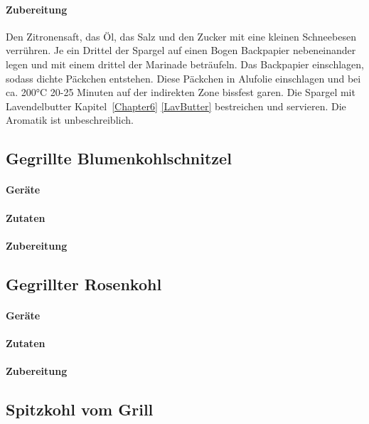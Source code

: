 \paragraph{Zubereitung}
Den Zitronensaft, das Öl, das Salz und den Zucker mit eine kleinen Schneebesen 
verrühren. Je ein Drittel der Spargel auf einen Bogen Backpapier nebeneinander 
legen und mit einem drittel der Marinade beträufeln. Das Backpapier 
einschlagen, sodass dichte Päckchen entstehen. Diese Päckchen in Alufolie 
einschlagen und bei ca. 200°C 20-25 Minuten auf der indirekten Zone bissfest 
garen. Die Spargel mit Lavendelbutter Kapitel~\ref{Chapter6} \vref{LavButter} 
bestreichen und servieren. Die Aromatik ist unbeschreiblich.

\subsection{Gegrillte Blumenkohlschnitzel}

\paragraph{Geräte}

\paragraph{Zutaten}

\paragraph{Zubereitung}


\subsection{Gegrillter Rosenkohl}

\paragraph{Geräte}

\paragraph{Zutaten}

\paragraph{Zubereitung}

\subsection{Spitzkohl vom Grill}

